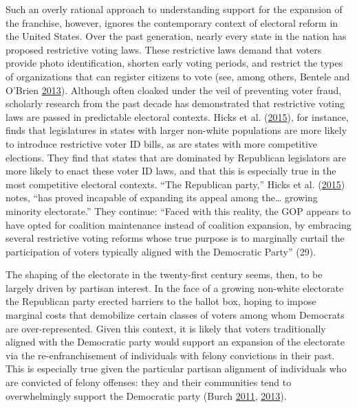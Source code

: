 \documentclass[
  12pt,
]{article}
\begin{document}
Such an overly rational approach to understanding support for the expansion of the franchise, however, ignores the contemporary context of electoral reform in the United States. Over the past generation, nearly every state in the nation has proposed restrictive voting laws. These restrictive laws demand that voters provide photo identification, shorten early voting periods, and restrict the types of organizations that can register citizens to vote (see, among others, Bentele and O'Brien \protect\hyperlink{ref-Bentele2013}{2013}). Although often cloaked under the veil of preventing voter fraud, scholarly research from the past decade has demonstrated that restrictive voting laws are passed in predictable electoral contexts. Hicks et al. (\protect\hyperlink{ref-Hicks2015}{2015}), for instance, finds that legislatures in states with larger non-white populations are more likely to introduce restrictive voter ID bills, as are states with more competitive elections. They find that states that are dominated by Republican legislators are more likely to enact these voter ID laws, and that this is especially true in the most competitive electoral contexts. ``The Republican party,'' Hicks et al. (\protect\hyperlink{ref-Hicks2015}{2015}) notes, ``has proved incapable of expanding its appeal among the\ldots{} growing minority electorate.'' They continue: ``Faced with this reality, the GOP appears to have opted for coalition maintenance instead of coalition expansion, by embracing several restrictive voting reforms whose true purpose is to marginally curtail the participation of voters typically aligned with the Democratic Party'' (29).

The shaping of the electorate in the twenty-first century seems, then, to be largely driven by partisan interest. In the face of a growing non-white electorate the Republican party erected barriers to the ballot box, hoping to impose marginal costs that demobilize certain classes of voters among whom Democrats are over-represented. Given this context, it is likely that voters traditionally aligned with the Democratic party would support an expansion of the electorate via the re-enfranchisement of individuals with felony convictions in their past. This is especially true given the particular partisan alignment of individuals who are convicted of felony offenses: they and their communities tend to overwhelmingly support the Democratic party (Burch \protect\hyperlink{ref-Burch2011}{2011}, \protect\hyperlink{ref-Burch2013}{2013}).
\end{document}
